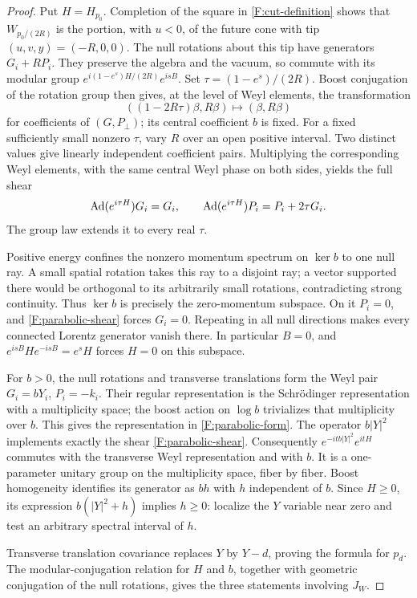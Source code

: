 \begin{proof}
Put $H=H_{p_0}$. Completion of the square in
\eqref{F:cut-definition} shows that $W_{p_0/(2R)}$ is the portion,
with $u<0$, of the future cone with tip $(u,v,y)=(-R,0,0)$.
The null rotations about this tip have generators $G_i+RP_i$.
They preserve the algebra and the vacuum, so commute with its modular
group
$e^{i(1-e^s)H/(2R)}e^{isB}$.
Set $\tau=(1-e^s)/(2R)$. Boost conjugation of the rotation group then
gives, at the level of Weyl elements, the transformation
\[
 ((1-2R\tau)\beta,R\beta)\longmapsto(\beta,R\beta)
\]
for coefficients of $(G,P_\perp)$; its central coefficient $b$ is fixed.
For a fixed sufficiently small nonzero $\tau$, vary $R$ over an open
positive interval. Two distinct values give linearly independent
coefficient pairs. Multiplying the corresponding Weyl elements, with
the same central Weyl phase on both sides, yields the full shear
\begin{equation}\label{F:parabolic-shear}
 \operatorname{Ad}(e^{i\tau H})G_i=G_i,\qquad
 \operatorname{Ad}(e^{i\tau H})P_i=P_i+2\tau G_i.
\end{equation}
The group law extends it to every real $\tau$.

Positive energy confines the nonzero momentum spectrum on $\ker b$ to
one null ray. A small spatial rotation takes this ray to a disjoint
ray; a vector supported there would be orthogonal to its arbitrarily
small rotations, contradicting strong continuity. Thus $\ker b$ is
precisely the zero-momentum subspace. On it $P_i=0$, and
\eqref{F:parabolic-shear} forces $G_i=0$. Repeating in all null directions
makes every connected Lorentz generator vanish there. In particular
$B=0$, and $e^{isB}He^{-isB}=e^sH$ forces $H=0$ on this subspace.

For $b>0$, the null rotations and transverse translations form the Weyl
pair $G_i=bY_i$, $P_i=-k_i$. Their regular representation is the
Schr\"odinger representation with a multiplicity space; the boost action
on $\log b$ trivializes that multiplicity over $b$. This gives the
representation in \eqref{F:parabolic-form}. The operator $b|Y|^2$
implements exactly the shear \eqref{F:parabolic-shear}. Consequently
$e^{-itb|Y|^2}e^{itH}$ commutes with the transverse Weyl representation
and with $b$. It is a one-parameter unitary group on the multiplicity
space, fiber by fiber. Boost homogeneity identifies its generator as
$bh$ with $h$ independent of $b$. Since $H\ge0$, its expression
$b(|Y|^2+h)$ implies $h\ge0$: localize the $Y$ variable near zero and
test an arbitrary spectral interval of $h$.

Transverse translation covariance replaces $Y$ by $Y-d$, proving the
formula for $p_d$. The modular-conjugation relation for $H$ and $b$,
together with geometric conjugation of the null rotations, gives the
three statements involving $J_W$.
\end{proof}

